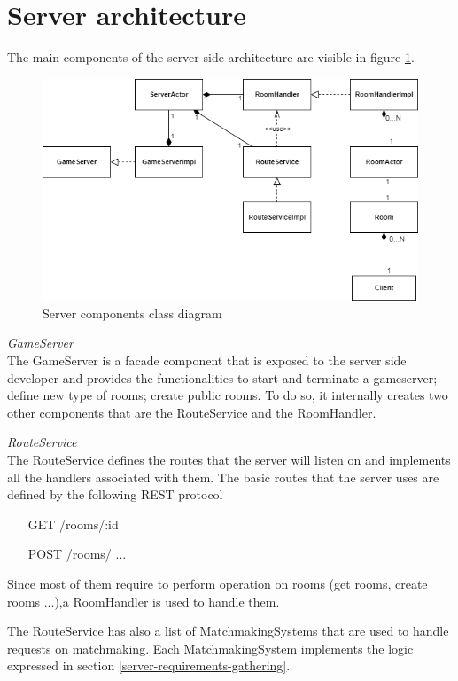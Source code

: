 \section{Server architecture}
The main components of the server side architecture are visible in figure \ref{fig:server_classes}. 

\begin{figure}[H]
	\includegraphics[scale=0.7]{images/3-architecture/server_architecture-classes.png}
	\caption{Server components class diagram}
	\label{fig:server_classes}
\end{figure}

\bigskip
\textit{GameServer}
\\
The GameServer is a facade component that is exposed to the server side developer and provides the functionalities to start and terminate a gameserver; define new type of rooms; create public rooms. To do so, it internally creates two other components that are the RouteService and the RoomHandler.

\bigskip
\textit{RouteService}
\\
The RouteService defines the routes that the server will listen on and implements all the handlers associated with them. The basic routes that the server uses are defined by the following REST protocol 

\begin{itemize}
	\item[GET]  /rooms/:id
	\item[POST] /rooms/
	...
\end{itemize}

Since most of them require to perform operation on rooms (get rooms, create rooms ...),a RoomHandler is used to handle them.

The RouteService has also a list of MatchmakingSystems that are used to handle requests on matchmaking. Each MatchmakingSystem implements the logic expressed in section \ref{server-requirements-gathering}. 


